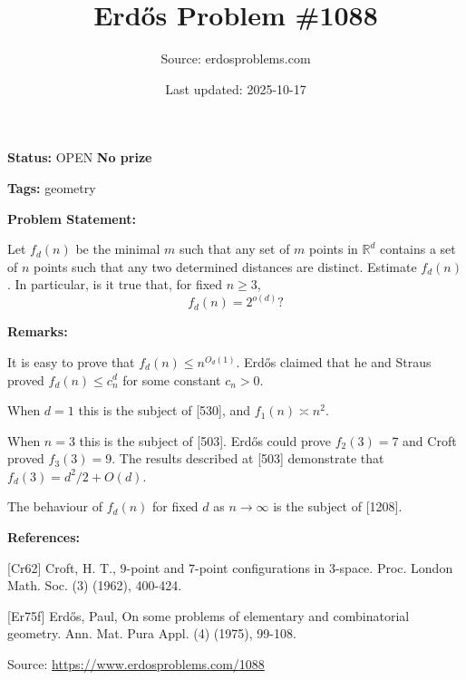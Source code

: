 \documentclass{article}
\title{Erd\H{o}s Problem \#1088}
\date{Last updated: 2025-10-17}
\author{Source: erdosproblems.com}
\begin{document}
\maketitle

\noindent\textbf{Status:} OPEN \quad \textbf{No prize}

\noindent\textbf{Tags:} geometry

\medskip
\noindent\textbf{Problem Statement:}

Let $f_d(n)$ be the minimal $m$ such that any set of $m$ points in $\mathbb{R}^d$ contains a set of $n$ points such that any two determined distances are distinct. Estimate $f_d(n)$. In particular, is it true that, for fixed $n\geq 3$,\[f_d(n)=2^{o(d)}?\]

\bigskip
\noindent\textbf{Remarks:}

It is easy to prove that $f_d(n) \leq n^{O_d(1)}$. Erd\H{o}s \cite{Er75f} claimed that he and Straus proved $f_d(n)\leq c_n^d$ for some constant $c_n>0$.

When $d=1$ this is the subject of [530], and $f_1(n)\asymp n^2$.

When $n=3$ this is the subject of [503]. Erd\H{o}s could prove $f_2(3)=7$ and Croft \cite{Cr62} proved $f_3(3)=9$. The results described at [503] demonstrate that $f_d(3)=d^2/2+O(d)$. 

The behaviour of $f_d(n)$ for fixed $d$ as $n\to \infty$ is the subject of [1208].

\bigskip
\noindent\textbf{References:}

[Cr62] Croft, H. T., $9$-point and $7$-point configurations in $3$-space. Proc. London Math. Soc. (3) (1962), 400-424.
 
 [Er75f] Erd\H{o}s, Paul, On some problems of elementary and combinatorial geometry. Ann. Mat. Pura Appl. (4) (1975), 99-108.

\bigskip
\noindent\small{Source: \url{https://www.erdosproblems.com/1088}}
\end{document}
